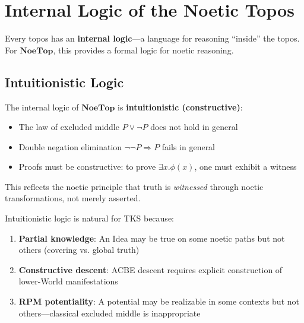\section{Internal Logic of the Noetic Topos}
\label{sec:internal-logic}

Every topos has an \textbf{internal logic}---a language for reasoning ``inside''
the topos. For $\mathbf{NoeTop}$, this provides a formal logic for noetic reasoning.

\subsection{Intuitionistic Logic}
\label{subsec:intuitionistic-logic}

\begin{theorem}
\label{thm:internal-intuitionistic}
The internal logic of $\mathbf{NoeTop}$ is \textbf{intuitionistic (constructive)}:
\begin{itemize}
  \item The law of excluded middle $P \lor \neg P$ does not hold in general
  \item Double negation elimination $\neg\neg P \Rightarrow P$ fails in general
  \item Proofs must be constructive: to prove $\exists x. \phi(x)$, one must
        exhibit a witness
\end{itemize}
This reflects the noetic principle that truth is \emph{witnessed} through
noetic transformations, not merely asserted.
\end{theorem}

\begin{remark}
\label{rem:noetic-intuitionistic}
Intuitionistic logic is natural for TKS because:
\begin{enumerate}[label=(\alph*)]
  \item \textbf{Partial knowledge}: An Idea may be true on some noetic paths
        but not others (covering vs. global truth)
  \item \textbf{Constructive descent}: ACBE descent requires explicit construction
        of lower-World manifestations
  \item \textbf{RPM potentiality}: A potential may be realizable in some contexts
        but not others---classical excluded middle is inappropriate
\end{enumerate}
\end{remark}

